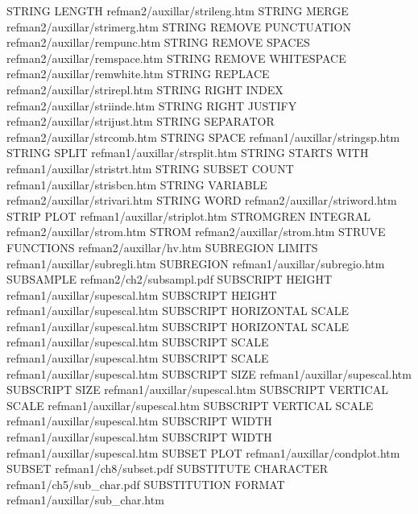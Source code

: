 STRING LENGTH                           refman2/auxillar/strileng.htm
STRING MERGE                            refman2/auxillar/strimerg.htm
STRING REMOVE PUNCTUATION               refman2/auxillar/rempunc.htm
STRING REMOVE SPACES                    refman2/auxillar/remspace.htm
STRING REMOVE WHITESPACE                refman2/auxillar/remwhite.htm
STRING REPLACE                          refman2/auxillar/strirepl.htm
STRING RIGHT INDEX                      refman2/auxillar/striinde.htm
STRING RIGHT JUSTIFY                    refman2/auxillar/strijust.htm
STRING SEPARATOR                        refman2/auxillar/strcomb.htm
STRING SPACE                            refman1/auxillar/stringsp.htm
STRING SPLIT                            refman1/auxillar/strsplit.htm
STRING STARTS WITH                      refman1/auxillar/stristrt.htm
STRING SUBSET COUNT                     refman1/auxillar/strisbcn.htm
STRING VARIABLE                         refman2/auxillar/strivari.htm
STRING WORD                             refman2/auxillar/striword.htm
STRIP PLOT                              refman1/auxillar/striplot.htm
STROMGREN INTEGRAL                      refman2/auxillar/strom.htm
STROM                                   refman2/auxillar/strom.htm
STRUVE FUNCTIONS                        refman2/auxillar/hv.htm
SUBREGION LIMITS                        refman1/auxillar/subregli.htm
SUBREGION                               refman1/auxillar/subregio.htm
SUBSAMPLE                               refman2/ch2/subsampl.pdf
SUBSCRIPT HEIGHT                        refman1/auxillar/supescal.htm
SUBSCRIPT HEIGHT                        refman1/auxillar/supescal.htm
SUBSCRIPT HORIZONTAL SCALE              refman1/auxillar/supescal.htm
SUBSCRIPT HORIZONTAL SCALE              refman1/auxillar/supescal.htm
SUBSCRIPT SCALE                         refman1/auxillar/supescal.htm
SUBSCRIPT SCALE                         refman1/auxillar/supescal.htm
SUBSCRIPT SIZE                          refman1/auxillar/supescal.htm
SUBSCRIPT SIZE                          refman1/auxillar/supescal.htm
SUBSCRIPT VERTICAL SCALE                refman1/auxillar/supescal.htm
SUBSCRIPT VERTICAL SCALE                refman1/auxillar/supescal.htm
SUBSCRIPT WIDTH                         refman1/auxillar/supescal.htm
SUBSCRIPT WIDTH                         refman1/auxillar/supescal.htm
SUBSET PLOT                             refman1/auxillar/condplot.htm
SUBSET                                  refman1/ch8/subset.pdf
SUBSTITUTE CHARACTER                    refman1/ch5/sub_char.pdf
SUBSTITUTION FORMAT                     refman1/auxillar/sub_char.htm
